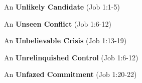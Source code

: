 \begin{compactenum}[I.][4]
	\item An \textbf{Unlikely Candidate} (Job 1:1-5) %
	\item An \textbf{Unseen Conflict} (Job 1:6-12)
	\item An \textbf{Unbelievable Crisis} (Job 1:13-19)
	\item An \textbf{Unrelinquished Control} (Job 1:6-12)
	\item An \textbf{Unfazed Commitment} (Job 1:20-22)
\end{compactenum}


